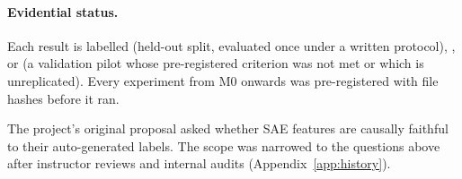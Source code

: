 \paragraph{Evidential status.} Each result is labelled  (held-out split, evaluated once under a written
protocol), , or  (a validation pilot whose pre-registered criterion was not met
or which is unreplicated). Every experiment from M0 onwards was pre-registered with file hashes before it ran.

The project's original proposal asked whether SAE features are causally faithful to their auto-generated labels. The
scope was narrowed to the questions above after instructor reviews and internal audits (Appendix~\ref{app:history}).
